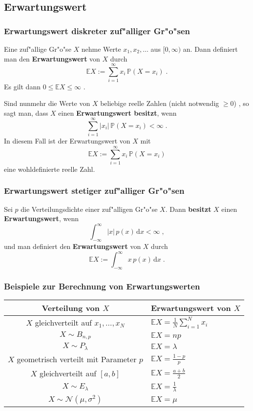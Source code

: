 \documentclass[ngerman,draft,parskip=half,twoside]{scrartcl}
\newcommand*{\E}{\mathbb{E}}        %
\newcommand*{\WKM}{\mathbb{P}}      %
\begin{document}
\subsection{Erwartungswert}
\subsubsection{Erwartungswert diskreter zuf"alliger Gr"o"sen}
Eine zuf"allige Gr"o"se $X$ nehme Werte $x_1,x_2,\ldots$ aus $[0,\infty)$ an. Dann
definiert man den \textbf{Erwartungswert} von $X$ durch
$$
\E X :=\sum_{i=1}^\infty x_i\,\WKM(X=x_i)\;.
$$
Es gilt dann $0\le \E X \le \infty$ .

Sind nunmehr die Werte von $X$ beliebige reelle Zahlen (nicht notwendig $\ge 0$)
, so sagt man, dass $X$ einen \textbf{Erwartungswert
besitzt}, wenn
$$
\sum_{i=1}^\infty |x_i|\,\WKM(X=x_i)<\infty\;.
$$
In diesem Fall ist der Erwartungswert von $X$ mit
$$
\E X :=\sum_{i=1}^\infty x_i\,\WKM(X=x_i)
$$
eine wohldefinierte reelle Zahl.

\subsubsection{Erwartungswert stetiger zuf"alliger Gr"o"sen}
Sei $p$ die Verteilungsdichte einer zuf"alligen Gr"o"se $X$. Dann \textbf{besitzt} $X$ einen
\textbf{Erwartungswert}, wenn
$$
\int_{-\infty}^\infty |x|\,p(x)\,\mathrm   d x <\infty\;,
$$
und man definiert den \textbf{Erwartungswert} von $X$ durch
$$
\E X := \int_{-\infty}^\infty x \,p(x)\,\mathrm   d x\;.
$$
\subsubsection{Beispiele zur Berechnung von Erwartungswerten}
\medskip

{\renewcommand{\arraystretch}{1.4}
\begin{center}
\begin{tabular}{|c|l|}\hline
\bf Verteilung von $X$& \bf Erwartungswert von $X$\\ \hline\hline
$X$ gleichverteilt auf $x_1,\ldots,x_N$& $\E X=\frac{1}{N}\sum_{i=1}^N x_i$\\ \hline
$X\sim B_{n,p}$& $\E X= n p$\\ \hline
$X\sim P_\lambda$&$\E X= \lambda$\\ \hline
$X$ geometrisch verteilt mit Parameter $p$& $\E X = \frac{1-p}{p}$\\ \hline
$X$ gleichverteilt auf $[a,b]$& $\E X= \frac{a+b}{2}$\\ \hline
$X\sim E_\lambda$& $\E X = \frac{1}{\lambda}$\\ \hline
$X\sim \mathcal N(\mu,\sigma^2)$&$ \E X = \mu$\\ \hline
\end{tabular}
\end{center}
}
\end{document}
